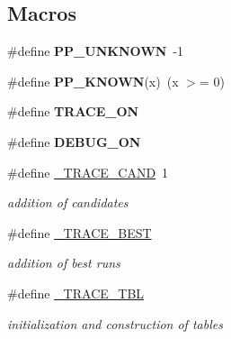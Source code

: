 \subsection*{Macros}
\begin{DoxyCompactItemize}
\item 
\mbox{\label{group__general_ga93c3f96b8b7345e4e15965f3938e4e0c}} 
\#define {\bfseries P\+P\+\_\+\+U\+N\+K\+N\+O\+WN}~-\/1
\item 
\mbox{\label{group__general_ga3f9e0147289a89265d742be9ea145fda}} 
\#define {\bfseries P\+P\+\_\+\+K\+N\+O\+WN}(x)~(x $>$= 0)
\item 
\mbox{\label{group__general_ga047013f5273eccbbfc0a08db5975f544}} 
\#define {\bfseries T\+R\+A\+C\+E\+\_\+\+ON}
\item 
\mbox{\label{group__general_ga911d91f7898a9a0c4e35bb71e01d39a0}} 
\#define {\bfseries D\+E\+B\+U\+G\+\_\+\+ON}
\item 
\mbox{\label{group__general_ga6745ebbbc3fb31c4d8ac57a551060028}} 
\#define \mbox{\hyperlink{group__general_ga6745ebbbc3fb31c4d8ac57a551060028}{\+\_\+\+T\+R\+A\+C\+E\+\_\+\+C\+A\+ND}}~1
\begin{DoxyCompactList}\small\item\em addition of candidates \end{DoxyCompactList}\item 
\mbox{\label{group__general_ga5a81e12e5b011ad54d8ddbf6be97ef34}} 
\#define \mbox{\hyperlink{group__general_ga5a81e12e5b011ad54d8ddbf6be97ef34}{\+\_\+\+T\+R\+A\+C\+E\+\_\+\+B\+E\+ST}}
\begin{DoxyCompactList}\small\item\em addition of best runs \end{DoxyCompactList}\item 
\mbox{\label{group__general_gad8cbb5acc06d85c055ae6d66d22b6b58}} 
\#define \mbox{\hyperlink{group__general_gad8cbb5acc06d85c055ae6d66d22b6b58}{\+\_\+\+T\+R\+A\+C\+E\+\_\+\+T\+BL}}
\begin{DoxyCompactList}\small\item\em initialization and construction of tables \end{DoxyCompactList}\item 

\end{DoxyCompactItemize}
